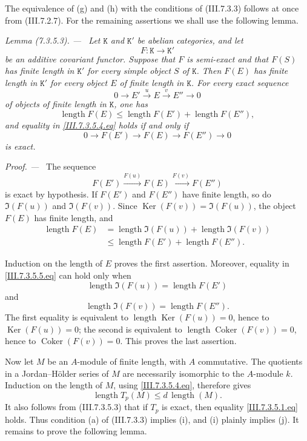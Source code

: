 \documentclass[10pt,oneside]{book}
\newcommand{\cat}[1]{\mathtt{#1}}
\newcommand{\Ker}{\operatorname{Ker}}
\newcommand{\Coker}{\operatorname{Coker}}
\newcommand{\sref}[2][]{(#2)}
\newcommand{\oldpage}[2][]{\setcounter{footnote}{0}\marginpar{\scriptsize\textbf{#1}~|~#2}\ignorespaces}
\newenvironment{lemma}[1][]{\par\medskip\noindent\itshape Lemma (#1). ---\ }{\par}
\newenvironment{proof}{\par\medskip\noindent\textit{Proof. ---\ }}{\par}
\begin{document}
The equivalence of (g) and (h) with the conditions of
\sref{III.7.3.3} follows at once from \sref{III.7.2.7}.  For
the remaining assertions we shall use the following lemma.

\begin{lemma}[7.3.5.3]
\label{III.7.3.5.3}
Let $\cat{K}$ and $\cat{K}'$ be abelian categories, and let
\[
  F:\cat{K}\longrightarrow\cat{K}'
\]
be an additive covariant functor.  Suppose that $F$ is
semi-exact and that $F(S)$ has finite length in $\cat{K}'$ for
every simple object $S$ of $\cat{K}$.  Then $F(E)$ has finite
length in $\cat{K}'$ for every object $E$ of finite length in
$\cat{K}$.  For every exact sequence
\[
  0\longrightarrow E'
  \xrightarrow{u}E
  \xrightarrow{v}E''
  \longrightarrow0
\]
of objects of finite length in $\cat{K}$, one has
\[
  \operatorname{length}F(E)
  \leq
  \operatorname{length}F(E')
  +
  \operatorname{length}F(E''),
  \tag{7.3.5.4}\label{III.7.3.5.4.eq}
\]
and equality in \eqref{III.7.3.5.4.eq} holds if and only if
\[
  0\longrightarrow F(E')
  \longrightarrow F(E)
  \longrightarrow F(E'')
  \longrightarrow0
\]
is exact.
\end{lemma}

\begin{proof}
The sequence
\[
  F(E')\xrightarrow{F(u)}F(E)\xrightarrow{F(v)}F(E'')
\]
is exact by hypothesis.  If $F(E')$ and $F(E'')$ have finite
length, so do $\Im(F(u))$ and $\Im(F(v))$.  Since
$\Ker(F(v))=\Im(F(u))$, the object $F(E)$ has finite length,
and
\[
  \begin{split}
  \operatorname{length}F(E)
  &=
  \operatorname{length}\Im(F(u))
  +
  \operatorname{length}\Im(F(v))
  \\
  &\leq
  \operatorname{length}F(E')
  +
  \operatorname{length}F(E'').
  \end{split}
  \tag{7.3.5.5}\label{III.7.3.5.5.eq}
\]

\oldpage[III]{183}

Induction on the length of $E$ proves the first assertion.
Moreover, equality in \eqref{III.7.3.5.5.eq} can hold only when
\[
  \operatorname{length}\Im(F(u))
  =
  \operatorname{length}F(E')
\]
and
\[
  \operatorname{length}\Im(F(v))
  =
  \operatorname{length}F(E'').
\]
The first equality is equivalent to
$\operatorname{length}\Ker(F(u))=0$, hence to $\Ker(F(u))=0$;
the second is equivalent to
$\operatorname{length}\Coker(F(v))=0$, hence to
$\Coker(F(v))=0$.  This proves the last assertion.
\end{proof}

Now let $M$ be an $A$-module of finite length, with $A$
commutative.  The quotients in a Jordan--H\"older series of
$M$ are necessarily isomorphic to the $A$-module $k$.
Induction on the length of $M$, using
\eqref{III.7.3.5.4.eq}, therefore gives
\[
  \operatorname{length}T_p(M)
  \leq
  d\,\operatorname{length}(M).
  \tag{7.3.5.6}\label{III.7.3.5.6.eq}
\]
It also follows from \sref{III.7.3.5.3} that if $T_p$ is exact,
then equality \eqref{III.7.3.5.1.eq} holds.  Thus condition
(a) of \sref{III.7.3.3} implies (i), and (i) plainly implies
(j).  It remains to prove the following lemma.
\end{document}
